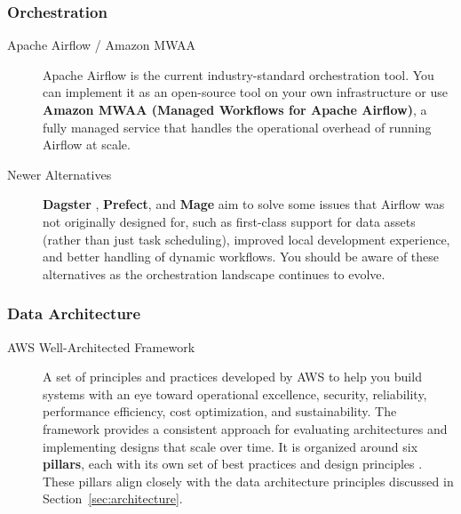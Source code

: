 \documentclass{article}
\begin{document}
\subsubsection{Orchestration}
\begin{description}
    \item[Apache Airflow / Amazon MWAA] Apache Airflow \cite{airflow2015} is the current industry-standard orchestration tool. You can implement it as an open-source tool on your own infrastructure or use \textbf{Amazon MWAA (Managed Workflows for Apache Airflow)}, a fully managed service that handles the operational overhead of running Airflow at scale.

    \item[Newer Alternatives] \textbf{Dagster} \cite{dagster2019}, \textbf{Prefect}, and \textbf{Mage} aim to solve some issues that Airflow was not originally designed for, such as first-class support for data assets (rather than just task scheduling), improved local development experience, and better handling of dynamic workflows. You should be aware of these alternatives as the orchestration landscape continues to evolve.
\end{description}

\subsubsection{Data Architecture}
\begin{description}
    \item[AWS Well-Architected Framework] A set of principles and practices developed by AWS to help you build systems with an eye toward operational excellence, security, reliability, performance efficiency, cost optimization, and sustainability. The framework provides a consistent approach for evaluating architectures and implementing designs that scale over time. It is organized around six \textbf{pillars}, each with its own set of best practices and design principles \cite{aws2023waf}. These pillars align closely with the data architecture principles discussed in Section~\ref{sec:architecture}.
\end{description}
\end{document}
